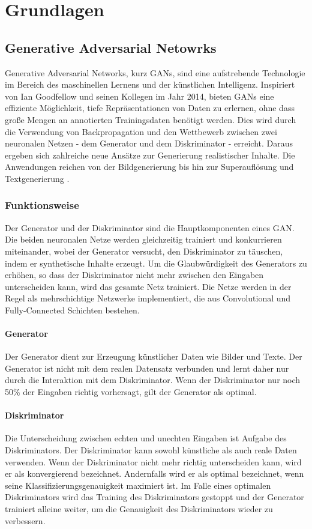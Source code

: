 \chapter{Grundlagen}

\section{Generative Adversarial Netowrks}
Generative Adversarial Networks, kurz GANs, sind eine aufstrebende Technologie im Bereich des maschinellen Lernens und der künstlichen Intelligenz. Inspiriert von Ian Goodfellow und seinen Kollegen im Jahr 2014, bieten GANs eine effiziente Möglichkeit, tiefe Repräsentationen von Daten zu erlernen, ohne dass große Mengen an annotierten Trainingsdaten benötigt werden\cite{Creswell.2018}. 
Dies wird durch die Verwendung von Backpropagation und den Wettbewerb zwischen zwei neuronalen Netzen - dem Generator und dem Diskriminator - erreicht. 
Daraus ergeben sich zahlreiche neue Ansätze zur Generierung realistischer Inhalte. 
Die Anwendungen reichen von der Bildgenerierung bis hin zur Superauflösung und Textgenerierung \cite{Aggarwal.2021}.

\subsection*{Funktionsweise}
Der Generator und der Diskriminator sind die Hauptkomponenten eines GAN. Die beiden neuronalen Netze werden gleichzeitig trainiert und konkurrieren miteinander, wobei der Generator versucht, den Diskriminator zu täuschen, indem er synthetische Inhalte erzeugt. Um die Glaubwürdigkeit des Generators zu erhöhen, so dass der Diskriminator nicht mehr zwischen den Eingaben unterscheiden kann, wird das gesamte Netz trainiert. Die Netze werden in der Regel als mehrschichtige Netzwerke implementiert, die aus Convolutional und Fully-Connected Schichten bestehen\cite{Creswell.2018}.

\subsubsection*{Generator}
Der Generator dient zur Erzeugung künstlicher Daten wie Bilder und Texte. 
Der Generator ist nicht mit dem realen Datensatz verbunden und lernt daher nur durch die Interaktion mit dem Diskriminator. Wenn der Diskriminator nur noch 50\% der Eingaben richtig vorhersagt, gilt der Generator als optimal\cite{Creswell.2018}.

\subsubsection*{Diskriminator}
Die Unterscheidung zwischen echten und unechten Eingaben ist Aufgabe des Diskriminators. Der Diskriminator kann sowohl künstliche als auch reale Daten verwenden. 
Wenn der Diskriminator nicht mehr richtig unterscheiden kann, wird er als konvergierend bezeichnet\cite{Aggarwal.2021}. Andernfalls wird er als optimal bezeichnet, wenn seine Klassifizierungsgenauigkeit maximiert ist. Im Falle eines optimalen Diskriminators wird das Training des Diskriminators gestoppt und der Generator trainiert alleine weiter, um die Genauigkeit des Diskriminators wieder zu verbessern\cite{Creswell.2018}.

